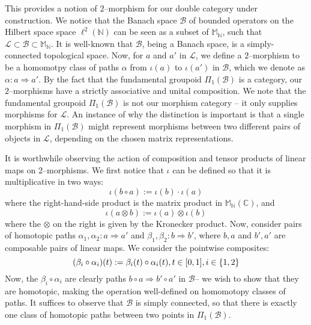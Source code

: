 \documentclass{amsart}
\newcommand{\M}{\mathbb{M}}
\newcommand{\N}{\mathbb{N}}
\newcommand{\C}{\mathbb{C}}
\newcommand{\s}{\mathscr}
\newcommand{\tensor}{\otimes}
\newcommand{\To}[1][]{\stackrel{#1}{\Longrightarrow}}
\newcommand{\curly}[1]{\left\{ #1 \right\}}
\newcommand{\set}[2][]{\ifthenelse{\equal{#1}{}}
                                  {\curly{#2}}
                                  {\curly{#1\ \textbf{:}\ #2}}}
\numberwithin{thm}{section}
\theoremstyle{definition}
\begin{document}
This provides a notion of $2$--morphism for our double category under
construction. We notice that the Banach space $\s{B}$ of bounded operators on
the Hilbert space space $\ell^2(\N)$ can be seen as a subset of $\M_{\N}$, such
that $\s{L} \subset \s{B} \subset \M_{\N}$. It is well-known that $\s{B}$, being
a Banach space, is a simply-connected topological space. Now, for $a$ and $a'$
in $\s{L}$, we define a $2$--morphism to be a homomotpy class of paths $\alpha$
from $\iota(a)$ to $\iota(a')$ in $\s{B}$, which we denote as
$\alpha : a \To a'$. By the fact that the fundamental groupoid
$\Pi_1(\s{B})$ is a category, our $2$--morphisms have a strictly associative and
unital composition.  We note that the fundamental groupoid $\Pi_1(\s{B})$ is not
our morphism category -- it only supplies morphisms for $\s{L}$. An instance of
why the distinction is important is that a single morphism in $\Pi_1(\s{B})$
might represent morphisms between two different pairs of objects in $\s{L}$,
depending on the chosen matrix representations.

It is worthwhile observing the action of composition and tensor products of
linear maps on $2$--morphisms. We first notice that $\iota$ can be defined so that
it is multiplicative in two ways:
\[
  \iota(b \circ a) := \iota(b) \cdot \iota(a)
\]
where the right-hand-side product is the matrix product in $\M_{\N}(\C)$, and
\[
  \iota(a \tensor b) := \iota(a) \tensor \iota(b)
\]
where the $\tensor$ on the right is given by the Kronecker product. Now,
consider pairs of homotopic paths
$\alpha_1, \alpha_2 : a \To a'$ and
$\beta_1, \beta_2 : b \To b'$, where $b, a$ and $b', a'$ are
composable pairs of linear maps. We consider the pointwise composites:
\begin{equation}\label{eqn:pointwise_comp}
  (\beta_i \circ \alpha_i)(t) := \beta_i(t) \circ \alpha_i(t), t \in [0, 1],
    i \in \set{1, 2}
\end{equation}
Now, the $\beta_i \circ \alpha_i$ are clearly paths
$b \circ a \To b' \circ a'$ in $\s{B}$-- we wish to show that
they are homotopic, making the operation well-defined on homomotopy classes of
paths. It suffices to observe that $\s{B}$ is simply connected, so that there is
exactly one class of homotopic paths between two points in $\Pi_1(\s{B})$.
\end{document}
